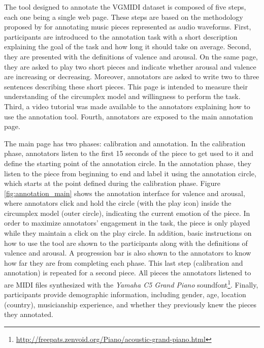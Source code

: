 The tool designed to annotate the VGMIDI dataset is composed of five steps, each one being a single web page. These steps are based on the methodology proposed by \citet{Soleymani_2013} for annotating music pieces represented as audio waveforms. First, participants are introduced to the annotation task with a short description explaining the goal of the task and how long it should take on average. Second, they are presented with the definitions of valence and arousal. On the same page, they are asked to play two short pieces and indicate whether arousal and valence are increasing or decreasing. Moreover, annotators are asked to write two to three sentences describing these short pieces. This page is intended to measure their understanding of the circumplex model and willingness to perform the task. Third, a video tutorial was made available to the annotators explaining how to use the annotation tool. Fourth, annotators are exposed to the main annotation page.

The main page has two phases: calibration and annotation. In the calibration phase, annotators listen to the first 15 seconds of the piece to get used to it and define the starting point of the annotation circle. In the annotation phase, they listen to the piece from beginning to end and label it using the annotation circle, which starts at the point defined during the calibration phase. Figure \ref{fig:annotation_main} shows the annotation interface for valence and arousal, where annotators click and hold the circle (with the play icon) inside the circumplex model (outer circle), indicating the current emotion of the piece. In order to maximize annotators' engagement in the task, the piece is only played while they maintain a click on the play circle. In addition, basic instructions on how to use the tool are shown to the participants along with the definitions of valence and arousal. A progression bar is also shown to the annotators to know how far they are from completing each phase. This last step (calibration and annotation) is repeated for a second piece. All pieces the annotators listened to are MIDI files synthesized with the \textit{Yamaha C5 Grand Piano} soundfont\footnote{\url{http://freepats.zenvoid.org/Piano/acoustic-grand-piano.html}}. Finally, participants provide demographic information, including gender, age, location (country), musicianship experience, and whether they previously knew the pieces they annotated.

